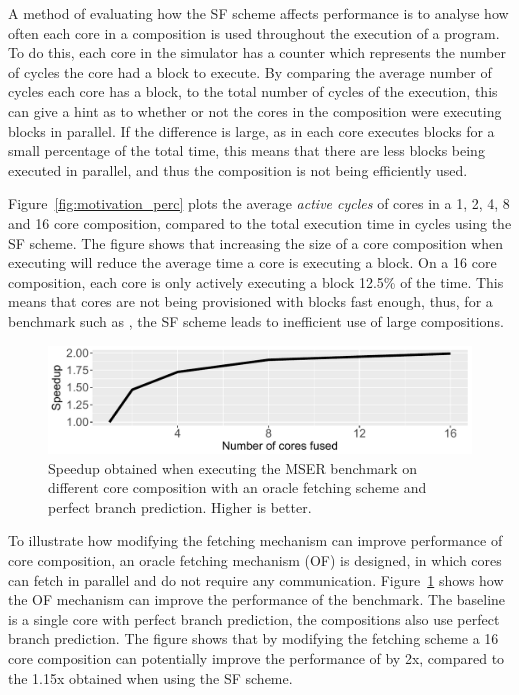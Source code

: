 A method of evaluating how the SF scheme affects performance is to analyse how often each core in a composition is used throughout the execution of a program.
To do this, each core in the simulator has a counter which represents the number of cycles the core had a block to execute.
By comparing the average number of cycles each core has a block, to the total number of cycles of the execution, this can give a hint as to whether or not the cores in the composition were executing blocks in parallel.
If the difference is large, as in each core executes blocks for a small percentage of the total time, this means that there are less blocks being executed in parallel, and thus the composition is not being efficiently used.

Figure~\ref{fig:motivation_perc} plots the average \textit{active cycles} of cores in a 1, 2, 4, 8 and 16 core composition, compared to the total execution time in cycles using the SF scheme.
The figure shows that increasing the size of a core composition when executing  will reduce the average time a core is executing a block.
On a 16 core composition, each core is only actively executing a block 12.5\% of the time.
This means that cores are not being provisioned with blocks fast enough, thus, for a benchmark such as , the SF scheme leads to inefficient use of large compositions.

\begin{figure}[t]
    \centering
    \includegraphics[width=1\textwidth]{chapter3/graphics/perfect_fetch_motiv.pdf}
    \caption{Speedup obtained when executing the MSER benchmark on different core composition with an oracle fetching scheme and perfect branch prediction. Higher is better.}
    \label{fig:motivation_fetch}
	\vspace{1em}
\end{figure}

To illustrate how modifying the fetching mechanism can improve performance of core composition, an oracle fetching mechanism (OF) is designed, in which cores can fetch in parallel and do not require any communication.
Figure~\ref{fig:motivation_fetch} shows how the OF mechanism can improve the performance of the  benchmark.
The baseline is a single core with perfect branch prediction, the compositions also use perfect branch prediction.
The figure shows that by modifying the fetching scheme a 16 core composition can potentially improve the performance of  by 2x, compared to the 1.15x obtained when using the SF scheme.

